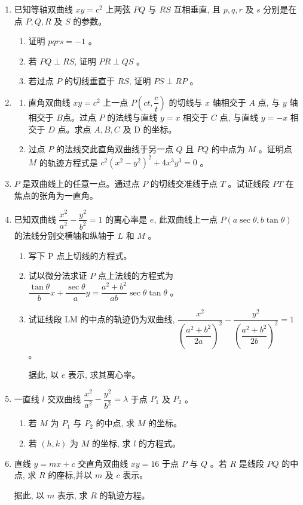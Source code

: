 \documentclass[10pt]{article}
\begin{document}
\begin{enumerate}
  \item 已知等轴双曲线 $x y=c^{2}$ 上两弦 $PQ$ 与 $RS$ 互相垂直, 且 $p, q, r$ 及 $s$ 分别是在点 $P, Q, R$ 及 $S$ 的参数。

  \begin{enumerate}
    \item 证明 $p q r s=-1$ 。
    \item 若 $PQ \perp RS$, 证明 $PR \perp QS$ 。
    \item 若过点 $P$ 的切线垂直于 $RS$, 证明 $PS \perp RP$ 。
  \end{enumerate}

  \item \begin{enumerate}
    \item 直角双曲线 $x y=c^{2}$ 上一点 $P\left(c t, \dfrac{c}{t}\right)$ 的切线与 $x$ 轴相交于 $A$ 点, 与 $y$ 轴相交于 $B$点。过点 $P$ 的法线与直线 $y=x$ 相交于 $C$ 点, 与直线 $y=-x$ 相交于 $D$ 点。求点 $A, B, C$ 及 D 的坐标。
    \item 过点 $P$ 的法线交此直角双曲线于另一点 $Q$ 且 $P Q$ 的中点为 $M$ 。证明点 $M$ 的轨迹方程式是 $c^{2}\left(x^{2}-y^{2}\right)^{2}+4 x^{3} y^{3}=0$ 。
  \end{enumerate}

  \item $P$ 是双曲线上的任意一点。通过点 $P$ 的切线交准线于点 $T$ 。试证线段 $PT$ 在焦点的张角为一直角。

  \item 已知双曲线 $\dfrac{x^{2}}{a^{2}}-\dfrac{y^{2}}{b^{2}}=1$ 的离心率是 $e$, 此双曲线上一点 $P(a \sec \theta, b \tan \theta)$ 的法线分别交横轴和纵轴于 $L$ 和 $M$ 。

  \begin{enumerate}
    \item 写下 P 点上切线的方程式。
    \item 试以微分法求证 $P$ 点上法线的方程式为 $\dfrac{\tan \theta}{b} x+\dfrac{\sec \theta}{a} y=\dfrac{a^{2}+b^{2}}{a b} \sec \theta \tan \theta$ 。
    \item 试证线段 LM 的中点的轨迹仍为双曲线, $\dfrac{x^{2}}{\left(\dfrac{a^{2}+b^{2}}{2 a}\right)^{2}}-\dfrac{y^{2}}{\left(\dfrac{a^{2}+b^{2}}{2 b}\right)^{2}}=1$ 。
    
    据此, 以 $e$ 表示, 求其离心率。
  \end{enumerate}

  \item 一直线 $l$ 交双曲线 $\dfrac{x^{2}}{a^{2}}-\dfrac{y^{2}}{b^{2}}=\lambda$ 于点 $P_{1}$ 及 $P_{2}$ 。

  \begin{enumerate}
    \item 若 $M$ 为 $P_{1}$ 与 $P_{2}$ 的中点, 求 $M$ 的坐标。
    \item 若 $(h, k)$ 为 $M$ 的坐标, 求 $l$ 的方程式。
  \end{enumerate}

  \item 直线 $y=m x+c$ 交直角双曲线 $x y=16$ 于点 $P$ 与 $Q$ 。若 $R$ 是线段 $PQ$ 的中点, 求 $R$ 的座标,并以 $m$ 及 $c$ 表示。

  据此, 以 $m$ 表示, 求 $R$ 的轨迹方程。

\end{enumerate}
\end{document}
